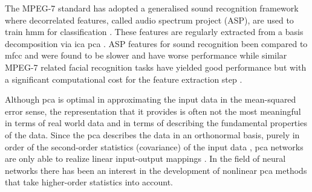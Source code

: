 The MPEG-7 standard \cite{Casey2001} has adopted a generalised sound recognition framework where decorrelated \DIFdelbegin {}\DIFdelend \DIFaddbegin {}\DIFaddend features, called audio spectrum project (ASP), are used to train \DIFdelbegin {}\DIFdelend \DIFaddbegin \gls{hmm} \DIFaddend for classification \cite{Kim2006}. These features are regularly extracted from a basis decomposition via \DIFdelbegin {}\DIFdelend \DIFaddbegin \gls{ica} \gls{pca} \DIFaddend \cite{Casey2001}\cite{Kim2003}\cite{Kim2006}. ASP features for sound recognition \DIFdelbegin {}\DIFdelend \DIFaddbegin {}\DIFaddend been compared to \DIFdelbegin {}\DIFdelend \DIFaddbegin \gls{mfcc} \DIFaddend and were found to be slower and have worse performance \cite{Kim2004} while similar MPEG-7 related facial recognition tasks have yielded good performance but with a significant computational cost for the feature extraction step \cite{Zaeri2006}.

Although \DIFdelbegin {}\DIFdelend \DIFaddbegin \gls{pca} \DIFaddend is optimal in approximating the input data in the mean-squared error sense, the representation that it provides is often not the most meaningful in terms of real world data and in terms of describing the fundamental properties of the data. Since the \DIFdelbegin {}\DIFdelend \DIFaddbegin \gls{pca} \DIFaddend describes the data in an orthonormal basis, purely in order of the second-order statistics (covariance) of the input data \citep{Oja1995}, \DIFdelbegin {}\DIFdelend \DIFaddbegin {}\gls{pca} \DIFaddend networks are only able to realize linear input-output mappings \citep{Karhunen1995}. In the field of neural networks there has been an interest in the development of nonlinear \DIFdelbegin {}\DIFdelend \DIFaddbegin \gls{pca} \DIFaddend methods that take higher-order statistics into account.

